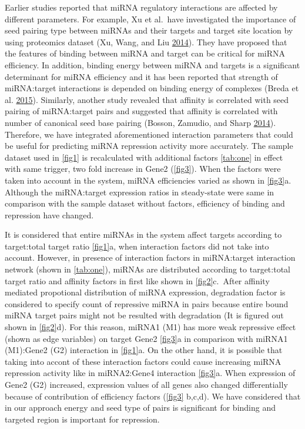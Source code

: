 \documentclass[a4,center,fleqn]{NAR}
\begin{document}
Earlier studies reported that miRNA regulatory interactions are affected
by different parameters. For example, Xu et al.~have investigated the
importance of seed pairing type between miRNAs and their targets and
target site location by using proteomics dataset (Xu, Wang, and Liu
\protect\hyperlink{ref-xu_characterization_2014}{2014}). They have
proposed that the features of binding between miRNA and target can be
critical for miRNA efficiency. In addition, binding energy between miRNA
and targets is a significant determinant for miRNA efficiency and it has
been reported that strength of miRNA:target interactions is depended on
binding energy of complexes (Breda et al.
\protect\hyperlink{ref-breda_quantifying_2015}{2015}). Similarly,
another study revealed that affinity is correlated with seed pairing of
miRNA:target pairs and suggested that affinity is correlated with number
of canonical seed base pairing (Bosson, Zamudio, and Sharp
\protect\hyperlink{ref-bosson_endogenous_2014}{2014}). Therefore, we
have integrated aforementioned interaction parameters that could be
useful for predicting miRNA repression activity more accurately. The
sample dataset used in \autoref{fig1} is recalculated with additional
factors \autoref{tab:one} in effect with same trigger, two fold increase
in Gene2 (\autoref{fig3}). When the factors were taken into account in
the system, miRNA efficiencies varied as shown in \autoref{fig3}a.
Although the miRNA:target expression ratios in steady-state were same in
comparison with the sample dataset without factors, efficiency of
binding and repression have changed.

It is considered that entire miRNAs in the system affect targets
according to target:total target ratio \autoref{fig1}a, when interaction
factors did not take into account. However, in presence of interaction
factors in miRNA:target interaction network (shown in
\autoref{tab:one}), miRNAs are distributed according to target:total
target ratio and affinity factors in first like shown in
\autoref{fig2}c.~After affinity mediated propotional distribution of
miRNA expression, degradation factor is considered to specify count of
repressive miRNA in pairs because entire bound miRNA target pairs might
not be resulted with degradation (It is figured out shown in
\autoref{fig2}d). For this reason, miRNA1 (M1) has more weak repressive
effect (shown as edge variables) on target Gene2 \autoref{fig3}a in
comparison with miRNA1 (M1):Gene2 (G2) interaction in \autoref{fig1}a.
On the other hand, it is possible that taking into accont of these
interaction factors could cause increasing miRNA repression activity
like in miRNA2:Gene4 interaction \autoref{fig3}a. When expression of
Gene2 (G2) increased, expression values of all genes also changed
differentially because of contribution of efficiency factors
(\autoref{fig3} b,c,d). We have considered that in our approach energy
and seed type of pairs is significant for binding and targeted region is
important for repression.
\end{document}
